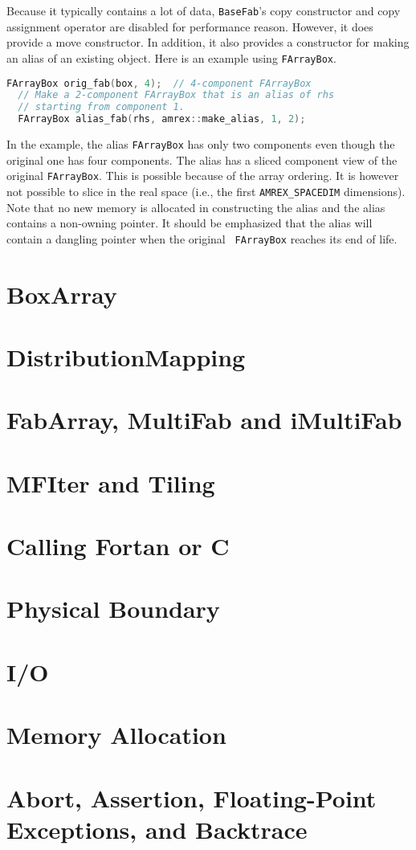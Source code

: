 Because it typically contains a lot of data, {\tt BaseFab}'s copy
constructor and copy assignment operator are disabled for performance
reason.  However, it does provide a move constructor.  In addition, it
also provides a constructor for making an alias of an existing
object.  Here is an example using {\tt FArrayBox}.
\begin{lstlisting}[language=cpp]
  FArrayBox orig_fab(box, 4);  // 4-component FArrayBox
  // Make a 2-component FArrayBox that is an alias of rhs
  // starting from component 1.
  FArrayBox alias_fab(rhs, amrex::make_alias, 1, 2);
\end{lstlisting}
In the example, the alias {\tt FArrayBox} has only two components even
though the original one has four components.  The alias has a sliced
component view of the original {\tt FArrayBox}.  This is possible
because of the array ordering.  It is however not possible to slice in
the real space (i.e., the first {\tt AMREX\_SPACEDIM} dimensions).
Note that no new memory is allocated in constructing the alias and the
alias contains a non-owning pointer.  It should be emphasized that the
alias will contain a dangling pointer when the original {\tt
  FArrayBox} reaches its end of life.

\section{BoxArray}

\section{DistributionMapping}

\section{FabArray, MultiFab and iMultiFab}
\label{sec:basics:multifab}


\section{MFIter and Tiling}

\section{Calling Fortan or C}
\label{sec:basics:fortran}

\section{Physical Boundary}

\section{I/O}

\section{Memory Allocation}


\section{Abort, Assertion, Floating-Point Exceptions, and Backtrace}
